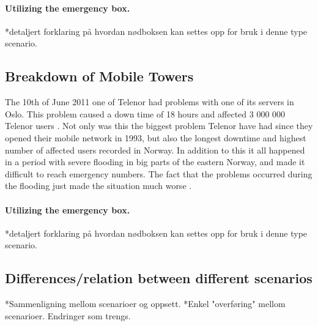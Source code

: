 \paragraph{Utilizing the emergency box.}
*detaljert forklaring på hvordan nødboksen kan settes opp for bruk i denne type scenario. 

\subsection{Breakdown of Mobile Towers}

The 10th of June 2011 one of Telenor had problems with one of its servers in Oslo. This problem caused a down time of 18 hours and affected 3 000 000 Telenor users \cite{listeNedetid}. Not only was this the biggest problem Telenor have had since they opened their mobile network in 1993, but also the longest downtime and highest number of affected users recorded in Norway. In addition to this it all happened in a period with severe flooding in big parts of the eastern Norway, and made it difficult to reach emergency numbers. The fact that the problems occurred during the flooding just made the situation much worse \cite{TelenorNede}.

\paragraph{Utilizing the emergency box.}
*detaljert forklaring på hvordan nødboksen kan settes opp for bruk i denne type scenario. 


\subsection{Differences/relation between different scenarios}
*Sammenligning mellom scenarioer og oppsett. 
*Enkel "overføring" mellom scenarioer. Endringer som trengs. 



